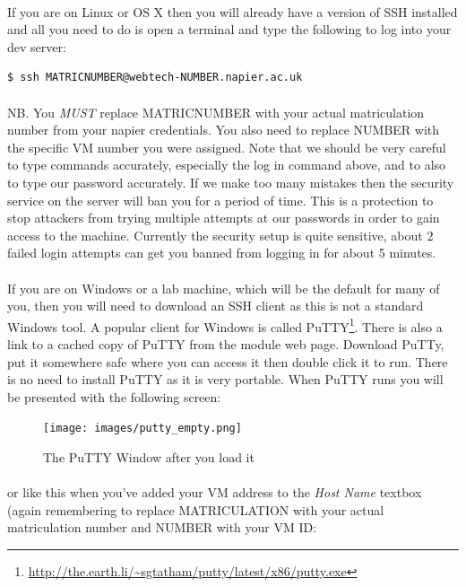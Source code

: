 \documentclass[12pt, a4paper, oneside]{book}
\begin{document}
\paragraph{} If you are on Linux or OS X then you will already have a version of SSH installed and all you need to do is open a terminal and type the following to log into your dev server:

\begin{lstlisting}[style=DOS]
    $ ssh MATRICNUMBER@webtech-NUMBER.napier.ac.uk
\end{lstlisting}

\paragraph{} NB. You \emph{MUST} replace MATRICNUMBER with your actual matriculation number from your napier credentials. You also need to replace NUMBER with the specific VM number you were assigned. Note that we should be very careful to type commands accurately, especially the log in command above, and to also to type our password accurately. If we make too many mistakes then the security service on the server will ban you for a period of time. This is a protection to stop attackers from trying multiple attempts at our passwords in order to gain access to the machine. Currently the security setup is quite sensitive, about 2 failed login attempts can get you banned from logging in for about 5 minutes.

\paragraph{} If you are on Windows or a lab machine, which will be the default for many of you, then you will need to download an SSH client as this is not a standard Windows tool. A popular client for Windows is called PuTTY\footnote{\url{http://the.earth.li/~sgtatham/putty/latest/x86/putty.exe}}. There is also a link to a cached copy of PuTTY from the module web page. Download PuTTy, put it somewhere safe where you can access it then double click it to run. There is no need to install PuTTY as it is very portable. When PuTTY runs you will be presented with the following screen:

\begin{figure}[H]
\centering
\texttt{[image: images/putty\_empty.png]}
\caption{The PuTTY Window after you load it}
\label{fig:putty-empty}
\end{figure}

\paragraph{} or like this when you've added your VM address to the \emph{Host Name} textbox (again remembering to replace MATRICULATION with your actual matriculation number and NUMBER with your VM ID:
\end{document}
